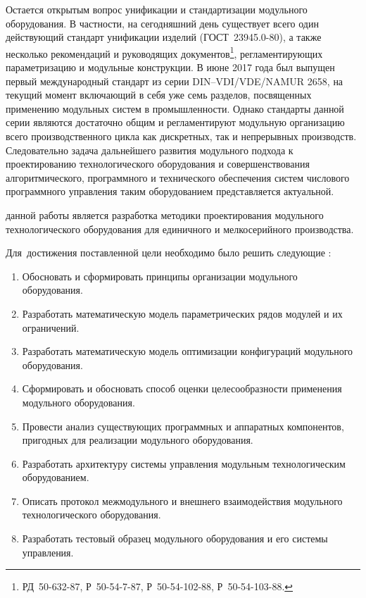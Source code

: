 Остается открытым вопрос унификации и стандартизации модульного оборудования. В частности, на сегодняшний день существует всего один действующий стандарт унификации изделий (ГОСТ~23945.0-80), а также несколько рекомендаций и руководящих документов\footnote{РД~50-632-87, Р~50-54-7-87, Р~50-54-102-88, Р~50-54-103-88.}, регламентирующих параметризацию и модульные конструкции. В июне 2017 года был выпущен первый международный стандарт из серии DIN--VDI/VDE/NAMUR 2658, на текущий момент включающий в себя уже семь разделов, посвященных применению модульных систем в промышленности. Однако стандарты данной серии являются достаточно общим и регламентируют модульную организацию всего производственного цикла как дискретных, так и непрерывных производств. Следовательно задача дальнейшего развития модульного подхода к проектированию технологического оборудования и совершенствования алгоритмического, программного и технического обеспечения систем числового программного управления таким оборудованием представляется актуальной.  


{\aim} данной работы является разработка методики проектирования модульного технологического оборудования для единичного и мелкосерийного производства.

Для~достижения поставленной цели необходимо было решить следующие {\tasks}:
\begin{enumerate}[beginpenalty=10000] %
  \item Обосновать и сформировать принципы организации модульного оборудования.
  \item Разработать математическую модель параметрических рядов модулей и их ограничений.
  \item Разработать математическую модель оптимизации конфигураций модульного оборудования.
  \item Сформировать и обосновать способ оценки целесообразности применения модульного оборудования.
  \item Провести анализ существующих программных и аппаратных компонентов, пригодных для реализации модульного оборудования.
  \item Разработать архитектуру системы управления модульным технологическим оборудованием.
  \item Описать протокол межмодульного и внешнего взаимодействия модульного технологического оборудования.
  \item Разработать тестовый образец модульного оборудования и его системы управления.
\end{enumerate}


